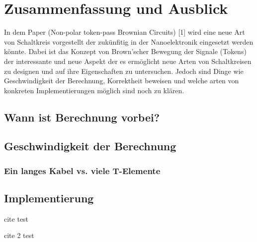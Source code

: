 \documentclass[11pt,a4paper]{article}
\begin{document}
\section{Zusammenfassung und Ausblick}
In dem Paper (Non-polar token-pass Brownian Circuits) [1] wird eine neue Art
von Schaltkreis vorgestellt der zukünfitig in der Nanoelektronik eingesetzt
werden könnte.
%
Dabei ist das Konzept von Brown'scher Bewegung der Signale (Tokens) 
der interessante und neue Aspekt der es ermöglicht neue Arten von Schaltkreisen 
zu designen und auf ihre Eigenschaften zu untersuchen.
%
Jedoch sind Dinge wie Geschwindigkeit der Berechnung, Korrektheit beweisen und 
welche arten von konkreten Implementierungen möglich sind noch zu klären.


\subsection{Wann ist Berechnung vorbei?}

\subsection{Geschwindigkeit der Berechnung}

\subsubsection{Ein langes Kabel vs. viele T-Elemente}

\subsection{Implementierung}
cite \cite{Worsch_2012_IUA_ip_acri} test

cite 2 \cite{Worsch_2009_AUC_ar} test



\end{document}
